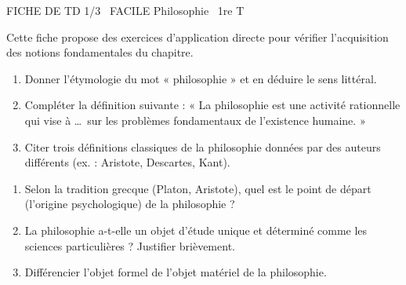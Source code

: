 \documentclass[11pt]{article}
\begin{document}
\begin{tcolorbox}[enhanced,colback=popink,colframe=popink,arc=10pt,boxrule=0pt,left=12pt,right=12pt,top=9pt,bottom=9pt]
{\color{white}\popxbold\small FICHE DE TD 1/3 \textbullet\ FACILE \hfill Philosophie \textbullet\ 1re T\par}
\end{tcolorbox}
\vspace{4pt}
Cette fiche propose des exercices d'application directe pour vérifier l'acquisition des notions fondamentales du chapitre.

\begin{exercice}
\begin{enumerate}
    \item Donner l'étymologie du mot « philosophie » et en déduire le sens littéral.
    \item Compléter la définition suivante : « La philosophie est une activité rationnelle qui vise à \ldots\ sur les problèmes fondamentaux de l'existence humaine. »
    \item Citer trois définitions classiques de la philosophie données par des auteurs différents (ex. : Aristote, Descartes, Kant).
\end{enumerate}
\end{exercice}

\begin{exercice}
\begin{enumerate}
    \item Selon la tradition grecque (Platon, Aristote), quel est le point de départ (l'origine psychologique) de la philosophie ?
    \item La philosophie a-t-elle un objet d'étude unique et déterminé comme les sciences particulières ? Justifier brièvement.
    \item Différencier l'objet formel de l'objet matériel de la philosophie.
\end{enumerate}
\end{exercice}
\end{document}
